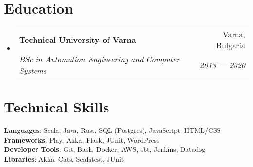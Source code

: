 \documentclass[letterpaper,11pt]{article}
\makeatletter
\newcommand{\resumeSubheading}[4]{
  \vspace{-2pt}\item
    \begin{tabular*}{0.97\textwidth}[t]{l@{\extracolsep{\fill}}r}
      #1 & #2 \\ %
      \textit{\small#3} & \textit{\small #4} \\
    \end{tabular*}\vspace{-7pt}
}
\newcommand{\resumeSubHeadingListStart}{\begin{itemize}[leftmargin=0.15in, label={}]}
\newcommand{\resumeSubHeadingListEnd}{\end{itemize}}
\makeatother
\begin{document}
\section{Education}
  \resumeSubHeadingListStart
    \resumeSubheading
      {\textbf{Technical University of Varna}}{Varna, Bulgaria}
      {BSc in Automation Engineering and Computer Systems}{2013 ---  2020}
  \resumeSubHeadingListEnd


%
\section{Technical Skills}
\begin{itemize}[leftmargin=0.15in, label={}]
  \small{\item{
        \textbf{Languages}{: Scala, Java, Rust, SQL (Postgres), JavaScript, HTML/CSS} \\
        \textbf{Frameworks}{: Play, Akka, Flask, JUnit, WordPress} \\
        \textbf{Developer Tools}{: Git, Bash, Docker, AWS, sbt, Jenkins, Datadog} \\
        \textbf{Libraries}{: Akka, Cats, Scalatest, JUnit}
        }}
\end{itemize}


\end{document}
